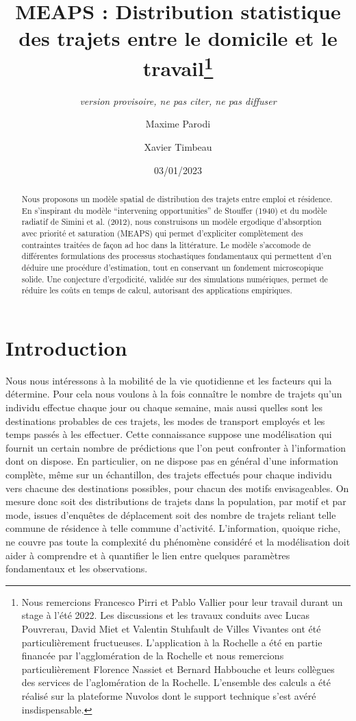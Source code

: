 \documentclass[
  10pt,
  a4paper,
  numbers=noendperiod,
  DIV=12]{scrartcl}
\title{MEAPS : Distribution statistique des trajets entre le domicile et
le travail\thanks{Nous remercions Francesco Pirri et Pablo Vallier pour
leur travail durant un stage à l'été 2022. Les discussions et les
travaux conduits avec Lucas Pouvrerau, David Miet et Valentin Stuhfault
de Villes Vivantes ont été particulièrement fructueuses. L'application à
la Rochelle a été en partie financée par l'agglomération de la Rochelle
et nous remercions particulièrement Florence Nassiet et Bernard
Habbouche et leurs collègues des services de l'aglomération de la
Rochelle. L'ensemble des calculs a été réalisé sur la plateforme Nuvolos
dont le support technique s'est avéré insdispensable.}}
\subtitle{\emph{version provisoire, ne pas citer, ne pas diffuser}}
\author{Maxime Parodi \and Xavier Timbeau}
\date{03/01/2023}
\renewcommand*\contentsname{Table des matières}
\newcommand\contentsname{Table des matières}
\begin{document}
\maketitle
\begin{abstract}
Nous proposons un modèle spatial de distribution des trajets entre
emploi et résidence. En s'inspirant du modèle ``intervening
opportunities'' de Stouffer (1940) et du modèle radiatif de Simini et
al. (2012), nous construisons un modèle ergodique d'absorption avec
priorité et saturation (MEAPS) qui permet d'expliciter complètement des
contraintes traitées de façon ad hoc dans la littérature. Le modèle
s'accomode de différentes formulations des processus stochastiques
fondamentaux qui permettent d'en déduire une procédure d'estimation,
tout en conservant un fondement microscopique solide. Une conjecture
d'ergodicité, validée sur des simulations numériques, permet de réduire
les coûts en temps de calcul, autorisant des applications empiriques.
\end{abstract}
\ifdefined\Shaded\renewenvironment{Shaded}{\begin{tcolorbox}[borderline west={3pt}{0pt}{shadecolor}, boxrule=0pt, enhanced, frame hidden, interior hidden, sharp corners, breakable]}{\end{tcolorbox}}\fi

\renewcommand*\contentsname{Table des matières}
{
\hypersetup{linkcolor=}
\setcounter{tocdepth}{1}
\tableofcontents
}
\hypertarget{introduction}{%
\section*{Introduction}\label{introduction}}

Nous nous intéressons à la mobilité de la vie quotidienne et les
facteurs qui la détermine. Pour cela nous voulons à la fois connaître le
nombre de trajets qu'un individu effectue chaque jour ou chaque semaine,
mais aussi quelles sont les destinations probables de ces trajets, les
modes de transport employés et les temps passés à les effectuer. Cette
connaissance suppose une modélisation qui fournit un certain nombre de
prédictions que l'on peut confronter à l'information dont on dispose. En
particulier, on ne dispose pas en général d'une information complète,
même sur un échantillon, des trajets effectués pour chaque individu vers
chacune des destinations possibles, pour chacun des motifs
envisageables. On mesure donc soit des distributions de trajets dans la
population, par motif et par mode, issues d'enquêtes de déplacement soit
des nombre de trajets reliant telle commune de résidence à telle commune
d'activité. L'information, quoique riche, ne couvre pas toute la
complexité du phénomène considéré et la modélisation doit aider à
comprendre et à quantifier le lien entre quelques paramètres
fondamentaux et les observations.
\end{document}

